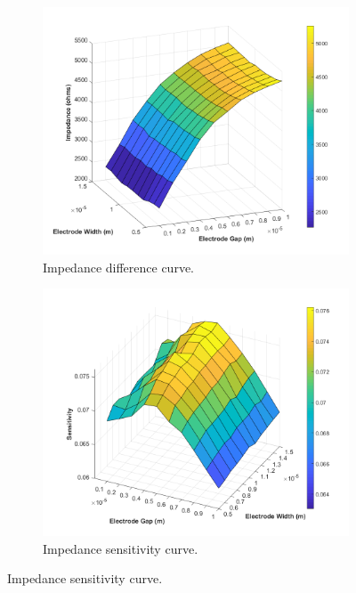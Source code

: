 \begin{figure}[h]
    \centering
    \begin{subfigure}[t]{0.49\textwidth}
        \centering
        \includegraphics[width=\textwidth]{images/comsol_simple_difference.png}
        \caption{Impedance difference curve.}
    \end{subfigure}
    \hfill
    \begin{subfigure}[t]{0.49\textwidth}
        \centering
        \includegraphics[width=\textwidth]{images/comsol_simple_sensitivity_surface.png}
        \caption{Impedance sensitivity curve.}

\end{subfigure}
\end{figure}
